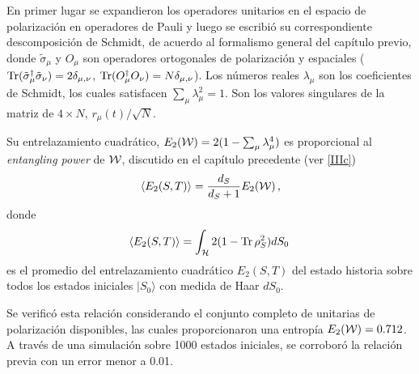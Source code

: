 En primer lugar se expandieron los operadores unitarios en el espacio de polarización en operadores de Pauli y luego se escribió su correspondiente descomposición de  Schmidt, de acuerdo al formalismo general del capítulo previo,  %
 donde
$\tilde{\sigma}_{\mu}$ y $O_{\mu}$ son operadores ortogonales de polarización y espaciales 
(${\rm Tr} (\tilde{\sigma}_{\mu}^{\dagger}\tilde{\sigma}_{\nu})=2\delta_{\mu,\nu}$, ${\rm  Tr}(O_{\mu}^{\dagger}O_{\nu})= N\delta_{\mu,\nu}$). Los números reales $\lambda_{\mu}$ son los coeficientes de Schmidt,
los cuales satisfacen $\sum_{\mu}\lambda_{\mu}^2=1$. Son los valores singulares de la matriz de  $4\times N$, $r_{\mu}(t)/\sqrt{N}$. 

Su entrelazamiento cuadrático, $E_2({\cal W}) = 2(1-\sum_{\mu}\lambda_{\mu}^4)$ es
   proporcional al {\it entangling power} de ${\cal W}$, discutido en el capítulo precedente  (ver \ref{IIIc}) 
\begin{equation}
 \langle E_2 (S,T)\rangle=\frac{d_S}{d_S+1}E_2({\cal W})\,, \label{rel}
\end{equation}
donde 
 \begin{equation}
 \langle E_2 (S,T)\rangle=
 \int_{\cal H} 2(1- {\rm Tr}\,\rho_S^2) d S_0\, \label{ME2}
\end{equation}
es el promedio del entrelazamiento cuadrático $E_2(S,T)$
del estado historia sobre todos los estados iniciales $|S_0\rangle$ con medida de Haar $dS_0$. 

Se verificó esta relación considerando el conjunto completo de unitarias de polarización disponibles, las cuales proporcionaron una entropía $ E_2({\cal W})=0.712$. A través de una simulación sobre 1000 estados iniciales, se corroboró la  relación previa con un error menor a 0.01. 



